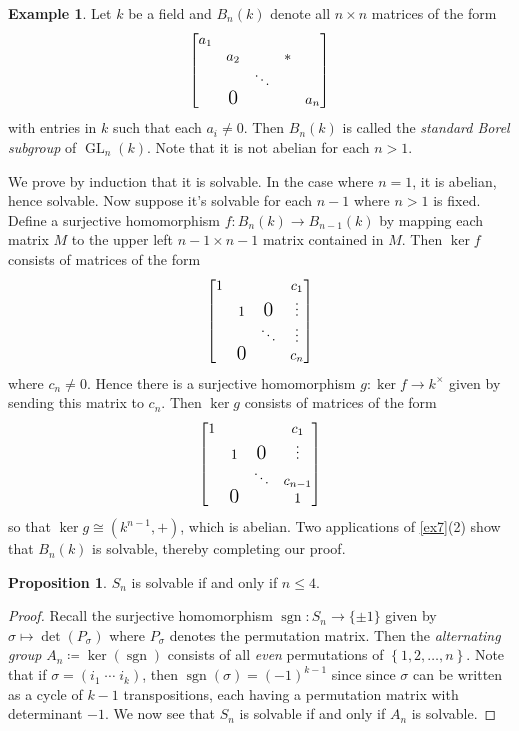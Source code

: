 \documentclass[10pt,letterpaper,cm]{nupset}
\theoremstyle{definition}
\newtheorem{exmp}[definition]{Example}
\theoremstyle{theorem}
\newtheorem{prop}[definition]{Proposition}
\theoremstyle{remark}
\newcommand{\1}{\mathbf{1}}
\newcommand{\0}{\vec 0}
\DeclareMathOperator*{\GL}{GL}
\DeclareMathOperator{\sgn}{sgn}
\begin{document}
\begin{exmp}
Let $k$ be a field and  $B_n(k)$ denote all $n\times n$ matrices of the form
\[
  \left[
    \begin{matrix}
       a_1 & & &  &\\
       & a_2 & & \Large{*}  \\
       & & \ddots & & \\
       & \text{\Large0}  & & & a_{n} 
\\
    \end{matrix}
  \right]
\] with entries in $k$ such that each $a_i \ne 0$. Then $B_n(k)$ is called the \textit{standard Borel subgroup} of $\GL_n(k)$. Note that it is not abelian for each $n>1$. 

\medskip

 We prove by induction that it is solvable.  In the case where $n=1$, it is abelian, hence solvable. Now suppose it's solvable for each $n-1$ where $n>1$ is fixed. Define a surjective homomorphism $f: B_n(k) \to B_{n-1}(k)$ by mapping each matrix $M$ to the upper left $n-1 \times n-1$ matrix contained in $M$. Then $\ker{f}$ consists of matrices of the form
\[
  \left[
    \begin{matrix}
       1 & & &  c_1\\
       & 1 &  \text{\Large0} & \vdots \\
       & & \ddots & \vdots  \\
        & \text{\Large0}  & &  c_{n} 
\\
    \end{matrix}
  \right]
\] where $c_{n} \ne 0$. Hence there is a surjective homomorphism $g: \ker{f} \to k^{\times}$ given by sending this matrix to $c_n$. Then $\ker{g}$ consists of matrices of the form
\[
  \left[
    \begin{matrix}
       1 & & &  c_1\\
       & 1 &  \text{\Large0} & \vdots \\
       & & \ddots & c_{n-1}  \\
        & \text{\Large0}  & &  1 
\\
    \end{matrix}
  \right]
  \] so that $\ker{g} \cong \left(k^{n-1}, +\right)$, which is abelian.  Two applications of \cref{ex7}(2) show that $B_n(k)$ is solvable, thereby completing our proof.
\end{exmp}

\begin{prop}
$S_n$ is solvable  if and only if $n\leq 4$.
\end{prop}
\begin{proof}
Recall the surjective homomorphism $\sgn: S_n \to \{\pm 1\}$ given by $\sigma \mapsto \det(P_\sigma)$ where $P_\sigma$ denotes the permutation matrix. Then the \textit{alternating group} $A_n \coloneqq \ker(\sgn)$ consists of all \textit{even} permutations of $\left\{1,2, \ldots, n\right\}$. Note that if $\sigma = \left(i_1 \; \cdots \; i_k\right)$, then $\sgn(\sigma) = \left({-1}\right)^{k-1}$ since since $\sigma$ can be written as a cycle of
$k - 1$ transpositions, each having a permutation matrix with determinant ${-1}$. We now see that $S_n$ is solvable  if and only if $A_n$ is solvable. 
\end{proof}
\end{document}
